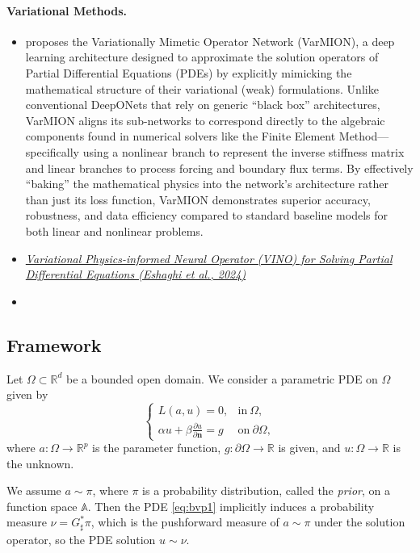\documentclass[11pt]{article}
\newcommand{\bbR}{\mathbb{R}}
\begin{document}
\paragraph{Variational Methods.}
\begin{itemize}
\item\cite{patel2024variationally} proposes the Variationally Mimetic Operator Network (VarMION), a deep learning architecture designed to approximate the solution operators of Partial Differential Equations (PDEs) by explicitly mimicking the mathematical structure of their variational (weak) formulations. Unlike conventional DeepONets that rely on generic ``black box'' architectures, VarMION aligns its sub-networks to correspond directly to the algebraic components found in numerical solvers like the Finite Element Method—specifically using a nonlinear branch to represent the inverse stiffness matrix and linear branches to process forcing and boundary flux terms. By effectively ``baking'' the mathematical physics into the network's architecture rather than just its loss function, VarMION demonstrates superior accuracy, robustness, and data efficiency compared to standard baseline models for both linear and nonlinear problems.

\item\href{https://arxiv.org/abs/2411.06587}{\it Variational Physics-informed Neural Operator (VINO) for Solving Partial Differential Equations (Eshaghi et al., 2024)}

\item\cite{alberts2023physics}
\end{itemize}

\subsection{Framework}
Let $\Omega\subset\bbR^d$ be a bounded open domain. We consider a parametric PDE on $\Omega$ given by
\begin{equation}
\begin{cases}
    L(a,u)=0, &\text{in}\ \Omega,\\
    \alpha u+\beta\frac{\partial u}{\partial\mathbf{n}}=g &\text{on}\ \partial\Omega,
\end{cases}\label{eq:bvp1}
\end{equation}
where $a:\Omega\to\bbR^p$ is the parameter function, $g:\partial\Omega\to\bbR$ is given, and $u:\Omega\to\bbR$ is the unknown.

We assume $a\sim\pi$, where $\pi$ is a probability distribution, called the \textit{prior}, on a function space $\mathbb{A}$. Then the PDE \eqref{eq:bvp1} implicitly induces a probability measure $\nu=G^*_\sharp\pi$, which is the pushforward measure of $a\sim\pi$ under the solution operator, so the PDE solution $u\sim\nu$.
\end{document}
